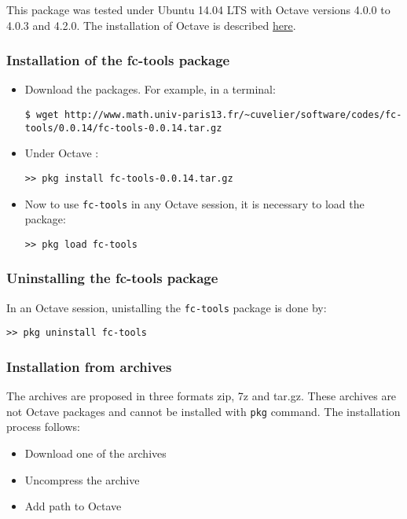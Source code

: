 This package was tested under Ubuntu 14.04 LTS with Octave versions 4.0.0 to 4.0.3 and 4.2.0. The installation of Octave is described 
\href{http://www.math.univ-paris13.fr/~cuvelier/Octave.html}{here}.

\subsubsection{Installation of the fc-tools package}

\begin{itemize}
\item Download the packages. For example, in a terminal:
\begin{verbatim}
$ wget http://www.math.univ-paris13.fr/~cuvelier/software/codes/fc-tools/0.0.14/fc-tools-0.0.14.tar.gz
\end{verbatim}
\item Under Octave :
\begin{verbatim}
>> pkg install fc-tools-0.0.14.tar.gz
\end{verbatim}
\item Now to use \texttt{fc-tools} in any Octave session, it is necessary to load the package:
\begin{verbatim}
>> pkg load fc-tools
\end{verbatim}
\end{itemize}

\subsubsection{Uninstalling the fc-tools package}
In an Octave session, unistalling the \texttt{fc-tools} package is done by:
\begin{verbatim}
>> pkg uninstall fc-tools
\end{verbatim}

\subsubsection{Installation from archives}
The archives are proposed in three formats zip, 7z and tar.gz. These archives are not Octave packages and cannot be installed with \texttt{pkg} command.
The installation process follows:
\begin{itemize}
\item Download one of the archives
\item Uncompress the archive
\item Add path to Octave
\end{itemize}

